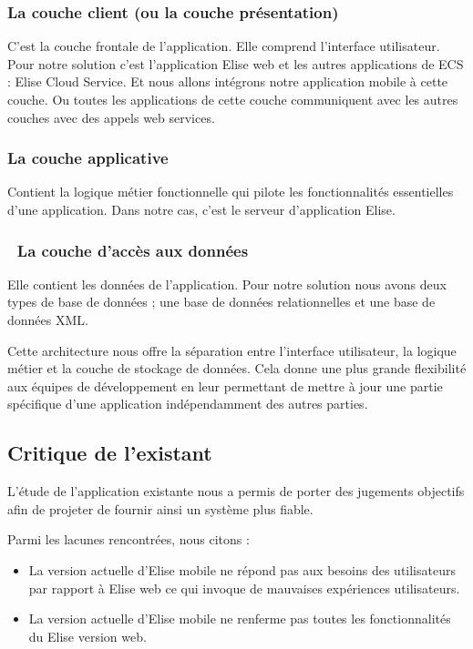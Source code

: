\subsubsection{La couche client (ou la couche présentation)}
C'est la couche frontale de l'application. Elle comprend l'interface utilisateur. Pour notre solution c'est l'application Elise web et les autres applications de ECS : Elise Cloud Service. Et nous allons intégrons notre application mobile à cette couche. Ou toutes les applications de cette couche communiquent avec les autres couches avec des appels web services.

\subsubsection{La couche applicative}
Contient la logique métier fonctionnelle qui pilote les fonctionnalités essentielles d'une application. Dans notre cas, c'est le serveur d'application Elise.

\subsubsection{	La couche d'accès aux données}
Elle contient les données de l'application. Pour notre solution nous avons deux types de base de données ; une base de données relationnelles et une base de données XML.

Cette architecture nous offre la séparation entre l'interface utilisateur, la logique métier et la couche de stockage de données. Cela donne une plus grande flexibilité aux équipes de développement en leur permettant de mettre à jour une partie spécifique d'une application indépendamment des autres parties.


\subsection{Critique de l'existant}
L'étude de l'application existante nous a permis de porter des jugements objectifs afin de projeter de fournir ainsi un système plus fiable.

Parmi les lacunes rencontrées, nous citons :
\begin{itemize}
  \item La version actuelle d'Elise mobile ne répond pas aux besoins des utilisateurs par rapport à Elise web ce qui invoque de mauvaises expériences utilisateurs.
  \item La version actuelle d'Elise mobile ne renferme pas toutes les fonctionnalités du Elise version web.
\end{itemize}

